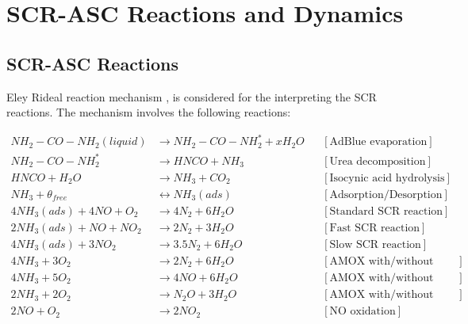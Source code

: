 \section{SCR-ASC Reactions and Dynamics}

\subsection{SCR-ASC Reactions}
Eley Rideal reaction mechanism \cite{hsieh2011development}
\cite{yuan2015diesel}, \cite{nova2014urea} is considered for the interpreting
the SCR reactions. The mechanism involves the following reactions:

\begin{align}
    NH_2 - CO - NH_2 (liquid) &\longrightarrow NH_2 - CO - NH_2^* + x H_2 O
                & &[\text{AdBlue evaporation}] \label{eqn::urea_1} \\
    NH_2 - CO - NH_2^*  &\longrightarrow  HNCO + NH_3
                & &[\text{Urea decomposition}] \label{eqn::urea_2}\\
    HNCO + H_2O &\longrightarrow NH_3 + CO_2
                & &[\text{Isocynic acid hydrolysis}] \label{eqn::urea_3}\\
    NH_3 + \theta_{free} &\longleftrightarrow NH_3(ads)
                & &[\text{Adsorption/Desorption}] \label{eqn::ads}\\
    4 NH_3 (ads) + 4 NO + O_2 &\longrightarrow 4 N_2 + 6 H_2O
                              & &[\text{Standard SCR reaction}]
                              \label{eqn::std_scr}\\
    2 NH_3 (ads) +  NO + N O_2 &\longrightarrow 2 N_2 + 3 H_2O
                              & &[\text{Fast SCR reaction}]
                              \label{eqn::fast_scr}\\
    4 NH_3 (ads) + 3N O_2 &\longrightarrow 3.5 N_2 + 6 H_2O
                              & &[\text{Slow SCR reaction}]
                              \label{eqn::slow_scr}\\
    4 NH_3 + 3 O_2 &\longrightarrow 2 N_2 + 6 H_2O
                         & &[\text{AMOX with/without ASC}]
                         \label{eqn::amox_N2}\\
    4 NH_3 + 5 O_2 &\longrightarrow 4 NO + 6 H_2 O
                         & &[\text{AMOX with/without ASC}]
                         \label{eqn::amox_NO}\\
    2 NH_3 + 2 O_2 &\longrightarrow N_2O + 3 H_2O
                         & &[\text{AMOX with/without ASC}]
                         \label{eqn::amox_N20}\\
    2 NO + O_2 &\longrightarrow 2 NO_2
                        & &[\text{NO oxidation}]
                        \label{eqn::NOX}
\end{align}


